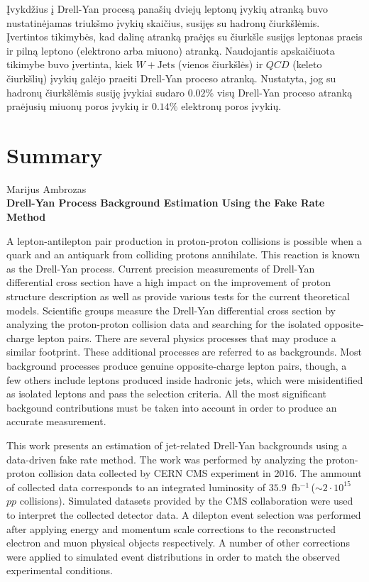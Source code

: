 \documentclass[a4paper, 12pt, oneside]{article}
\newcommand{\WJets}{W\! +\!\mathrm{Jets}}
\newcommand{\invfb}{fb$^{-1}\,$}
\newcommand{\QCD}{QC\! D}
\newlength\q
\begin{document}
Įvykdžius į Drell-Yan procesą panašių dviejų leptonų įvykių atranką buvo nustatinėjamas triukšmo įvykių skaičius, susijęs
su hadronų čiurkšlėmis.
Įvertintos tikimybės, kad dalinę atranką praėjęs su čiurkšle susijęs leptonas praeis ir pilną leptono (elektrono arba miuono) atranką.
Naudojantis apskaičiuota tikimybe buvo įvertinta, kiek $\WJets$ (vienos čiurkšlės) ir $\QCD$ (keleto čiurkšlių)
įvykių galėjo praeiti Drell-Yan proceso atranką.
Nustatyta, jog su hadronų čiurkšlėmis susiję įvykiai sudaro $0.02\%$ visų Drell-Yan proceso atranką praėjusių miuonų poros
įvykių ir $0.14\%$ elektronų poros įvykių.


\newpage
\section*{Summary}
\begin{centering}
Marijus Ambrozas\\
\textbf{Drell-Yan Process Background Estimation Using the Fake Rate Method}\\
\end{centering}
\vspace{0.5cm}

A lepton-antilepton pair production in proton-proton collisions is possible when a quark and an antiquark from colliding
protons annihilate.
This reaction is known as the Drell-Yan process.
Current precision measurements of Drell-Yan differential cross section have a high impact on the improvement
of proton structure description as well as provide various tests for the current theoretical models.
Scientific groups measure the Drell-Yan differential cross section by analyzing the proton-proton collision data and
searching for the isolated opposite-charge lepton pairs.
There are several physics processes that may produce a similar footprint.
These additional processes are referred to as backgrounds.
Most background processes produce genuine opposite-charge lepton pairs, though, a few others include leptons produced inside
hadronic jets, which were misidentified as isolated leptons and pass the selection criteria.
All the most significant backgound contributions must be taken into account in order to produce an accurate measurement.


This work presents an estimation of jet-related Drell-Yan backgrounds using a data-driven fake rate method.
The work was performed by analyzing the proton-proton collision data collected by CERN CMS experiment in 2016.
The ammount of collected data corresponds to an integrated luminosity of $35.9$~\invfb ($\sim\!2 \cdot 10^{15}$ $pp$ collisions).
Simulated datasets provided by the CMS collaboration were used to interpret the collected detector data.
A dilepton event selection was performed after applying energy and momentum scale corrections to the reconstructed electron and muon
physical objects respectively.
A number of other corrections were applied to simulated event distributions in order to match the observed experimental conditions.
\end{document}
